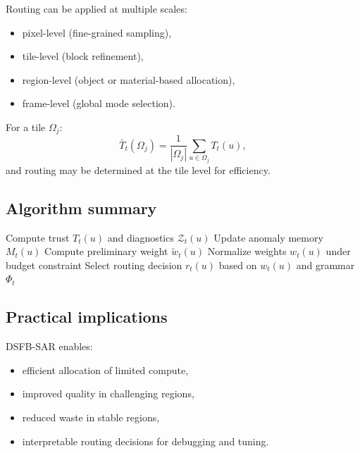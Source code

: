 \documentclass[11pt,letterpaper]{article}
\theoremstyle{gcresult}
\theoremstyle{definition}
\begin{document}
Routing can be applied at multiple scales:
\begin{itemize}[leftmargin=1.5em]
    \item pixel-level (fine-grained sampling),
    \item tile-level (block refinement),
    \item region-level (object or material-based allocation),
    \item frame-level (global mode selection).
\end{itemize}

For a tile $\Omega_j$:
\begin{equation}
\bar{T}_t(\Omega_j)=\frac{1}{|\Omega_j|}\sum_{u\in\Omega_j} T_t(u),
\end{equation}
and routing may be determined at the tile level for efficiency.


\subsection{Algorithm summary}

\begin{algorithm}[H]
\caption{DSFB-SAR Structural Adaptive Routing}
\begin{algorithmic}[1]
    \State Compute trust $T_t(u)$ and diagnostics $\mathcal{Z}_t(u)$
    \State Update anomaly memory $M_t(u)$
    \State Compute preliminary weight $\tilde{w}_t(u)$
\EndFor
\State Normalize weights $w_t(u)$ under budget constraint
    \State Select routing decision $r_t(u)$ based on $w_t(u)$ and grammar $\Phi_t$
\EndFor
\end{algorithmic}
\end{algorithm}


\subsection{Practical implications}

DSFB-SAR enables:
\begin{itemize}[leftmargin=1.5em]
    \item efficient allocation of limited compute,
    \item improved quality in challenging regions,
    \item reduced waste in stable regions,
    \item interpretable routing decisions for debugging and tuning.
\end{itemize}
\end{document}
